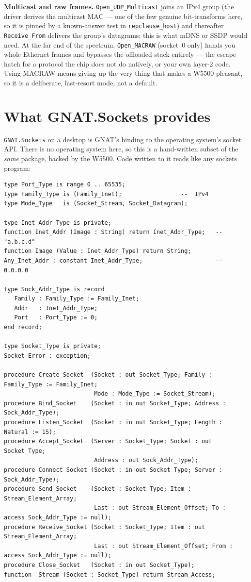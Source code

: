 \textbf{Multicast and raw frames.} \texttt{Open\_UDP\_Multicast} joins an IPv4 group
(the driver derives the multicast MAC --- one of the few genuine bit-transforms here,
so it is pinned by a known-answer test in \texttt{repclause\_host}) and thereafter
\texttt{Receive\_From} delivers the group's datagrams; this is what mDNS or SSDP would
need. At the far end of the spectrum, \texttt{Open\_MACRAW} (socket~0 only) hands you
whole Ethernet frames and bypasses the offloaded stack entirely --- the escape hatch
for a protocol the chip does not do natively, or your own layer-2 code. Using MACRAW
means giving up the very thing that makes a W5500 pleasant, so it is a deliberate,
last-resort mode, not a default.

\section{What GNAT.Sockets provides}
\label{ch:net:gnatsockets}

\texttt{GNAT.Sockets} on a desktop is GNAT's binding to the operating system's
socket API. There is no operating system here, so this is a hand-written subset of
the \emph{same} package, backed by the W5500. Code written to it reads like any
sockets program:

\begin{lstlisting}
type Port_Type is range 0 .. 65535;
type Family_Type is (Family_Inet);                 --  IPv4
type Mode_Type   is (Socket_Stream, Socket_Datagram);

type Inet_Addr_Type is private;
function Inet_Addr (Image : String) return Inet_Addr_Type;   --  "a.b.c.d"
function Image (Value : Inet_Addr_Type) return String;
Any_Inet_Addr : constant Inet_Addr_Type;                     --  0.0.0.0

type Sock_Addr_Type is record
   Family : Family_Type := Family_Inet;
   Addr   : Inet_Addr_Type;
   Port   : Port_Type := 0;
end record;

type Socket_Type is private;
Socket_Error : exception;

procedure Create_Socket  (Socket : out Socket_Type; Family : Family_Type := Family_Inet;
                          Mode : Mode_Type := Socket_Stream);
procedure Bind_Socket    (Socket : in out Socket_Type; Address : Sock_Addr_Type);
procedure Listen_Socket  (Socket : in out Socket_Type; Length : Natural := 15);
procedure Accept_Socket  (Server : Socket_Type; Socket : out Socket_Type;
                          Address : out Sock_Addr_Type);
procedure Connect_Socket (Socket : in out Socket_Type; Server : Sock_Addr_Type);
procedure Send_Socket    (Socket : Socket_Type; Item : Stream_Element_Array;
                          Last : out Stream_Element_Offset; To : access Sock_Addr_Type := null);
procedure Receive_Socket (Socket : Socket_Type; Item : out Stream_Element_Array;
                          Last : out Stream_Element_Offset; From : access Sock_Addr_Type := null);
procedure Close_Socket   (Socket : in out Socket_Type);
function  Stream (Socket : Socket_Type) return Stream_Access;
\end{lstlisting}

